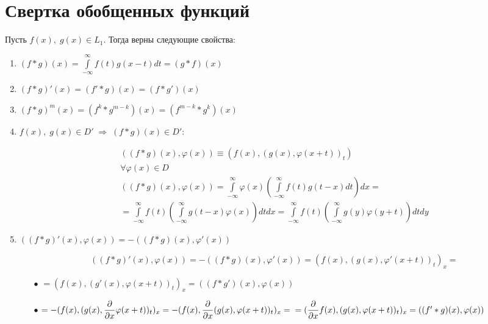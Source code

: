 \section*{Свертка обобщенных функций}

Пусть $f(x), \; g(x) \in L_1$. Тогда верны следующие свойства:

\begin{enumerate}
	\item 
		$ (f * g)(x) = \int\limits_{-\infty}^{\infty} f(t)g(x - t)dt = (g * f)(x)$ 
	\item 
		$ (f * g)'(x) = (f' * g)(x) = (f * g')(x)  $
	\item 
		$ (f * g)^{m}(x) = (f^{k} * g^{m - k})(x) = (f^{m - k} * g^{k})(x)  $
	\item 
		$ f(x), \; g(x) \in D' \; \Rightarrow \;  (f * g)(x) \in D': $
		\begin{Proof}
			$$\begin{gathered}
			((f * g)(x), \varphi(x)) \equiv (f(x), (g(x), \varphi(x + t))_t) \; \\ 
			\forall \varphi(x) \in D \\
			((f * g)(x), \varphi(x)) = \int\limits_{-\infty}^{\infty} \varphi(x) (\int\limits_{-\infty}^{\infty} f(t)g(t - x)dt)dx =\\
			= \int\limits_{-\infty}^{\infty} f(t) (\int\limits_{-\infty}^{\infty} g(t - x)\varphi(x))dtdx = \int\limits_{-\infty}^{\infty} f(t) (\int\limits_{-\infty}^{\infty} g(y)\varphi(y + t))dtdy
			\end{gathered}$$
		\end{Proof}
	\item 
		$ ((f * g)'(x), \varphi(x)) =  -((f * g)(x), \varphi'(x))$
		\begin{Proof}
			$$ ((f * g)'(x), \varphi(x)) =  -((f * g)(x), \varphi'(x)) = (f(x), (g(x), \varphi'(x + t))_t)_x = $$
			\begin{itemize}
				\item[$\bullet$] 
					$= (f(x), (g'(x), \varphi(x + t))_t)_x = ((f * g')(x), \varphi(x)) $
				\item[$\bullet$] 
					$= -(f(x), (g(x), \dfrac{\partial}{\partial x}\varphi(x + t))_t)_x = -(f(x), \dfrac{\partial}{\partial x}(g(x), \varphi(x + t))_t)_x = \\
					= (\dfrac{\partial}{\partial x}f(x), (g(x), \varphi(x + t))_t)_x = ((f' * g)(x), \varphi(x))$
			\end{itemize}
		\end{Proof}
\end{enumerate}

